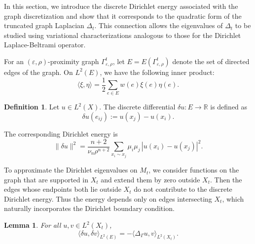 \documentclass[10 pt, reqno]{amsart}
\newtheorem{lemma}[theorem]{Lemma}
\theoremstyle{definition}
\newtheorem{definition}{Definition}
\numberwithin{equation}{section}
\begin{document}
In this section, we introduce the discrete Dirichlet energy associated with the graph discretization and show that it corresponds to the quadratic form of the truncated graph Laplacian $\Delta_t$. This connection allows the eigenvalues of $\Delta_t$ to be studied using variational characterizations analogous to those for the Dirichlet Laplace-Beltrami operator.

For an $(\varepsilon,\rho)$-proximity graph $\Gamma^t_{\varepsilon,\rho}$, let $E=E(\Gamma^t_{\varepsilon,\rho})$ denote the set of directed edges of the graph. On $L^2(E)$, we have the following inner product:
\[\langle \xi,\eta\rangle=\frac{1}{2}\sum_{e\in E}w(e)\xi(e)\eta(e).\]
\begin{definition}
    Let $u\in L^2(X)$. The discrete differential $\delta u:E\rightarrow\mathbb{R}$ is defined as 
    \[
\delta u(e_{ij}) := u(x_j)-u(x_i).
\]
\end{definition}


The corresponding Dirichlet energy is
\begin{equation}
    \label{eq:discrete_dirichlet_energy}
    \|\delta u\|^2
=
\frac{n+2}{\nu_n \rho^{n+2}}
\sum_{x_i \sim x_j}
\mu_i \mu_j \, |u(x_i)-u(x_j)|^2 .
\end{equation}

To approximate the Dirichlet eigenvalues on $M_t$, we consider functions on the graph that are supported in $X_t$ and extend them by zero outside $X_t$. Then the edges whose endpoints both lie outside $X_t$ do not contribute to the discrete Dirichlet energy. Thus the energy depends only on edges intersecting $X_t$, which naturally incorporates the Dirichlet boundary condition. 
\begin{lemma}
\label{lem:discrete-green}
For all $u,v \in L^2(X_t)$,
\[
\langle \delta u, \delta v \rangle_{L^2(E)}
=
-\langle \Delta_\Gamma u, v \rangle_{L^2(X_t)} .
\]
\end{lemma}
\end{document}
